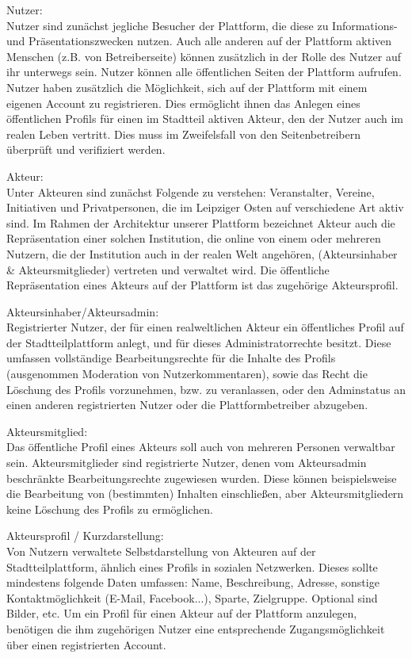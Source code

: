 \documentclass{swp}
\begin{document}
Nutzer:\\Nutzer sind zun\"achst jegliche Besucher der Plattform, die diese zu Informations- und Pr\"asentationszwecken nutzen. Auch alle anderen auf der Plattform aktiven Menschen (z.B. von Betreiberseite) k\"onnen zus\"atzlich in der Rolle des Nutzer auf ihr unterwegs sein. Nutzer k\"onnen alle \"offentlichen Seiten der Plattform aufrufen.\\ 
Nutzer haben zus\"atzlich die M\"oglichkeit, sich auf der Plattform mit einem eigenen Account zu registrieren. Dies erm\"oglicht ihnen das Anlegen eines \"offentlichen Profils f\"ur einen im Stadtteil aktiven Akteur, den der Nutzer auch im realen Leben vertritt. Dies muss im Zweifelsfall von den Seitenbetreibern \"uberpr\"uft und verifiziert werden.

Akteur:\\
Unter Akteuren sind zun\"achst Folgende zu verstehen: Veranstalter, Vereine, Initiativen und Privatpersonen, die im Leipziger Osten auf verschiedene Art aktiv sind. Im Rahmen der Architektur unserer Plattform bezeichnet \glqq Akteur\grqq{} auch die Repr\"asentation einer solchen Institution, die online von einem oder mehreren Nutzern, die der Institution auch in der realen Welt angeh\"oren, (Akteursinhaber \& Akteursmitglieder) vertreten und verwaltet wird. Die \"offentliche Repr\"asentation eines Akteurs auf der Plattform ist das zugeh\"orige Akteursprofil.

Akteursinhaber/Akteursadmin:\\Registrierter Nutzer, der f\"ur einen realweltlichen Akteur ein \"offentliches Profil auf der Stadtteilplattform anlegt, und f\"ur dieses Administratorrechte besitzt. Diese umfassen vollst\"andige Bearbeitungsrechte f\"ur die Inhalte des Profils (ausgenommen Moderation von Nutzerkommentaren), sowie das Recht die L\"oschung des Profils vorzunehmen, bzw. zu veranlassen, oder den Adminstatus an einen anderen registrierten Nutzer oder die Plattformbetreiber abzugeben.

Akteursmitglied:\\Das \"offentliche Profil eines Akteurs soll auch von mehreren Personen verwaltbar sein. Akteursmitglieder sind registrierte Nutzer, denen vom Akteursadmin beschr\"ankte Bearbeitungsrechte zugewiesen wurden. Diese k\"onnen beispielsweise die Bearbeitung von (bestimmten) Inhalten einschlie{\ss}en, aber Akteursmitgliedern keine L\"oschung des Profils zu erm\"oglichen.

Akteursprofil / Kurzdarstellung:\\Von Nutzern verwaltete Selbstdarstellung von Akteuren auf der Stadtteilplattform, \"ahnlich eines Profils in sozialen Netzwerken. Dieses sollte mindestens folgende Daten umfassen: Name, Beschreibung, Adresse, sonstige Kontaktm\"oglichkeit (E-Mail, Facebook...), Sparte, Zielgruppe. Optional sind Bilder, etc. Um ein Profil f\"ur einen Akteur auf der Plattform anzulegen, ben\"otigen die ihm zugeh\"origen Nutzer eine entsprechende Zugangsm\"oglichkeit \"uber einen registrierten Account.
\end{document}
